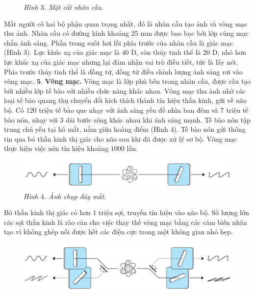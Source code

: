 \begin{multicols}{2}
\begin{figure}[H]
		\caption{\small\textit{\color{timhieukhoahoc}Hình $3$. Mặt cắt nhãn cầu.}}
		\vspace*{-10pt}
	\end{figure}
	Mắt người có hai bộ phận quan trọng nhất, đó là nhãn cầu tạo ảnh và võng mạc thu ảnh. Nhãn cầu có đường kính khoảng $25$ mm được bao bọc bởi lớp củng mạc chắn ánh sáng. Phần trong suốt hơi lồi phía trước của nhãn cầu là giác mạc (Hình $3$). Lực khúc xạ của giác mạc là $40$ D, còn thủy tinh thể là $20$ D, nhỏ hơn lực khúc xạ của giác mạc nhưng lại đảm nhận vai trò điều tiết, tức là lấy nét. Phía trước thủy tinh thể là đồng tử, đồng tử điều chỉnh lượng ánh sáng rơi vào võng mạc.
	\vskip 0.1cm
	$\pmb{5.}$ \textbf{\color{timhieukhoahoc}Võng mạc.}
	\vskip 0.1cm
	Võng mạc là lớp phủ bên trong nhãn cầu, được cấu tạo bởi nhiều lớp tế bào với nhiều chức năng khác nhau. Võng mạc thu ảnh nhờ các loại tế bào quang thụ chuyển đổi kích thích thành tín hiệu thần kinh, gửi về não bộ. Có $120$ triệu tế bào que nhạy với ánh sáng yếu đề nhìn ban đêm và $7$ triệu tế bào nón, nhạy với $3$ dải bước sóng khác nhau khi ánh sáng mạnh. Tế bào nón tập trung chủ yếu tại hố mắt, nằm giữa hoàng điểm (Hình $4$). Tế bào nón gửi thông tin qua bó thần kinh thị giác cho não sau khi đã được xử lý sơ bộ. Võng mạc thực hiện việc nén tín hiệu khoảng $1000$ lần.
	\begin{figure}[H]
		\vspace*{-5pt}
		\centering
		\captionsetup{labelformat= empty, justification=centering}
		\includegraphics[width= 0.75\linewidth]{4}
		\caption{\small\textit{\color{timhieukhoahoc}Hình $4$. Ảnh chụp đáy mắt.}}
		\vspace*{-10pt}
	\end{figure}
	Bó thần kinh thị giác có hơn $1$ triệu sợi, truyền tín hiệu vào não bộ. Số lượng lớn các sợi thần kinh là rào cản cho việc thay thế võng mạc bằng các cảm biến nhân tạo vì không ghép nối được hết các điện cực trong một không gian nhỏ hẹp. 
	\begin{figure}[H]
		\vspace*{-5pt}
		\centering
		\captionsetup{labelformat= empty, justification=centering}
		\includegraphics[width= 1\linewidth]{5}

\end{figure}
\end{multicols}
